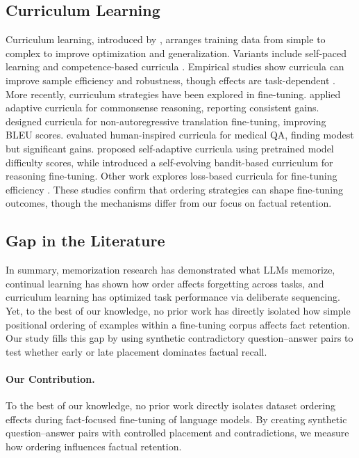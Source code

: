 \documentclass[11pt]{article}
\begin{document}
    \subsection{Curriculum Learning}
    Curriculum learning, introduced by \citet{bengio2009curriculum}, arranges training data from simple to complex to improve optimization and generalization. Variants include self-paced learning \citep{kumar2010self} and competence-based curricula \citep{graves2017automated}. Empirical studies show curricula can improve sample efficiency and robustness, though effects are task-dependent \citep{wu2020curricula}. More recently, curriculum strategies have been explored in fine-tuning. \citet{maharana2022curriculum} applied adaptive curricula for commonsense reasoning, reporting consistent gains. \citet{guo2019natcurriculum} designed curricula for non-autoregressive translation fine-tuning, improving BLEU scores. \citet{yang2024human} evaluated human-inspired curricula for medical QA, finding modest but significant gains. \citet{feng2025selfadaptive} proposed self-adaptive curricula using pretrained model difficulty scores, while \citet{chen2025selfevolving} introduced a self-evolving bandit-based curriculum for reasoning fine-tuning. Other work explores loss-based curricula for fine-tuning efficiency \citep{coghlan2025loss,lyu2025loss}. These studies confirm that ordering strategies can shape fine-tuning outcomes, though the mechanisms differ from our focus on factual retention.

    \subsection{Gap in the Literature}
    In summary, memorization research has demonstrated what LLMs memorize, continual learning has shown how order affects forgetting across tasks, and curriculum learning has optimized task performance via deliberate sequencing. Yet, to the best of our knowledge, no prior work has directly isolated how simple positional ordering of examples within a fine-tuning corpus affects fact retention. Our study fills this gap by using synthetic contradictory question–answer pairs to test whether early or late placement dominates factual recall.

    \paragraph{Our Contribution.}
    To the best of our knowledge, no prior work directly isolates dataset ordering effects during fact-focused fine-tuning of language models. By creating synthetic question–answer pairs with controlled placement and contradictions, we measure how ordering influences factual retention.
\end{document}
